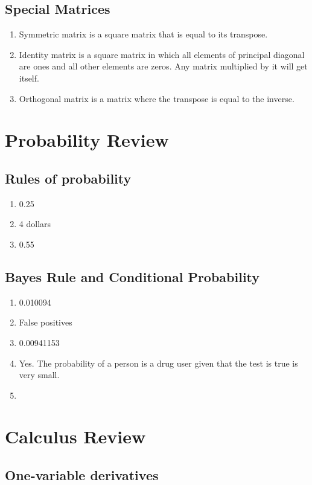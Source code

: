 \documentclass{article}
\def\enum#1{\begin{enumerate}#1\end{enumerate}}
\begin{document}
\subsection{Special Matrices}
\enum{
\item Symmetric matrix is a square matrix that is equal to its transpose.
\item Identity matrix is a square matrix in which all elements of principal diagonal are ones and all other elements are zeros. Any matrix multiplied by it will get itself.
\item Orthogonal matrix is a matrix where the transpose is equal to the inverse.
}

\section{Probability Review}

\subsection{Rules of probability}

\begin{enumerate}
\item 0.25
\item 4 dollars
\item 0.55
\end{enumerate}

\subsection{Bayes Rule and Conditional Probability}

\begin{enumerate}
\item 0.010094
\item False positives
\item 0.00941153
\item Yes. The probability of a person is a drug user given that the test is true is very small.
\item 
\end{enumerate}


\section{Calculus Review}


\subsection{One-variable derivatives}
\end{document}
